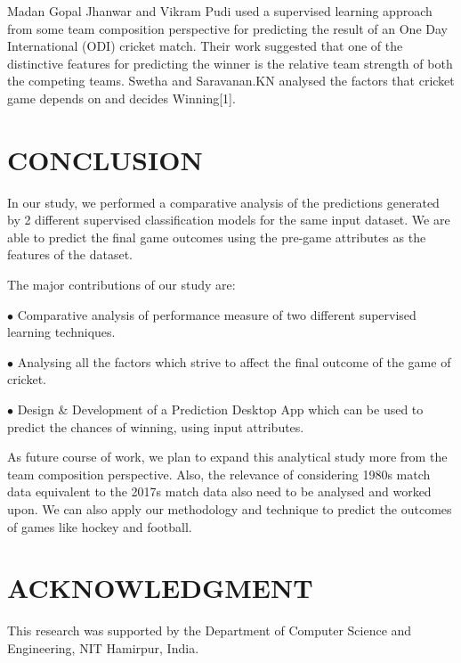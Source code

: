 \documentclass[a4paper, 10pt, conference]{IEEEtran}
\begin{document}
Madan Gopal Jhanwar and Vikram Pudi used a supervised learning approach from some team composition perspective for predicting the result of an One Day International (ODI) cricket match. Their work suggested that one of the distinctive features for predicting the winner is the relative team strength of both the competing teams. Swetha and Saravanan.KN analysed the factors that cricket game depends on and decides Winning[1]. 


\section{CONCLUSION}

In our study, we performed a comparative analysis of the predictions generated by 2 different supervised classification models for the same input dataset. We are able to predict the final game outcomes using the pre-game attributes as the features of the dataset.

The major contributions of our study are:
\begin{description}
  \item$\bullet$ Comparative analysis of performance measure of two different supervised learning techniques. 
  \item$\bullet$ Analysing all the factors which strive to affect the final outcome of the game of cricket.
  \item$\bullet$ Design \& Development of a Prediction Desktop App which can be used to predict the chances of winning, using input attributes.
\end{description}

As future course of work, we plan to expand this analytical study more from the team composition perspective. Also, the relevance of considering 1980s match data equivalent to the 2017s match data also need to be analysed and worked upon. We can also apply our methodology and technique to predict the outcomes of games like hockey and football.

\section{ACKNOWLEDGMENT}

This research was supported by the Department of Computer Science and Engineering, NIT Hamirpur, India.
\end{document}
